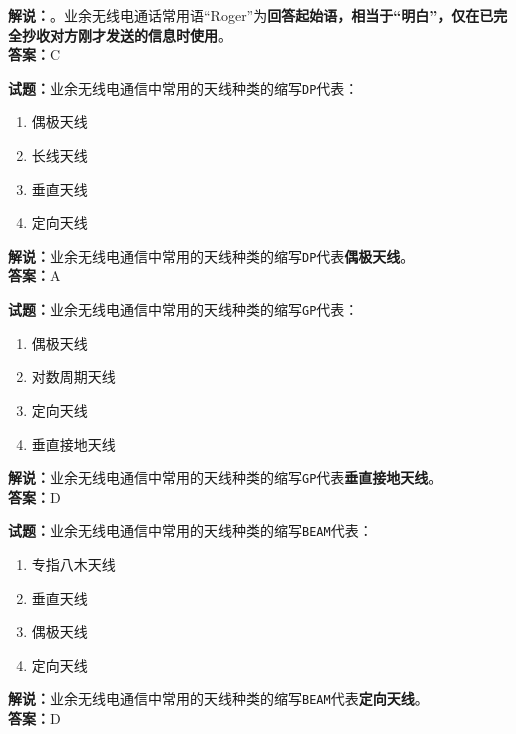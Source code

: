 \documentclass{ctexbook}
\begin{document}
\noindent\textbf{解说：}。业余无线电通话常用语“Roger”为\textbf{回答起始语，相当于“明白”，仅在已完全抄收对方刚才发送的信息时使用}。\\\noindent\textbf{答案：}C

\bigskip

\noindent\textbf{试题：}业余无线电通信中常用的天线种类的缩写\texttt{DP}代表：

\begin{enumerate}[leftmargin=3em]
  \item 偶极天线
  \item 长线天线
  \item 垂直天线
  \item 定向天线
\end{enumerate}

\noindent\textbf{解说：}业余无线电通信中常用的天线种类的缩写\texttt{DP}代表\textbf{偶极天线}。\\\noindent\textbf{答案：}A

\bigskip

\noindent\textbf{试题：}业余无线电通信中常用的天线种类的缩写\texttt{GP}代表：

\begin{enumerate}[leftmargin=3em]
  \item 偶极天线
  \item 对数周期天线
  \item 定向天线
  \item 垂直接地天线
\end{enumerate}

\noindent\textbf{解说：}业余无线电通信中常用的天线种类的缩写\texttt{GP}代表\textbf{垂直接地天线}。\\\noindent\textbf{答案：}D

\bigskip

\noindent\textbf{试题：}业余无线电通信中常用的天线种类的缩写\texttt{BEAM}代表：

\begin{enumerate}[leftmargin=3em]
  \item 专指八木天线
  \item 垂直天线
  \item 偶极天线
  \item 定向天线
\end{enumerate}

\noindent\textbf{解说：}业余无线电通信中常用的天线种类的缩写\texttt{BEAM}代表\textbf{定向天线}。\\\noindent\textbf{答案：}D

\bigskip
\end{document}
